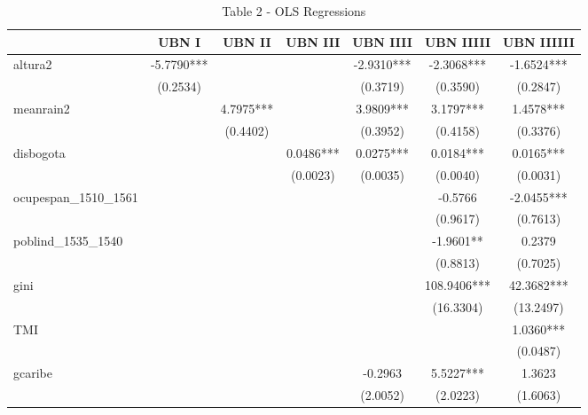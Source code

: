 \begin{table}
\caption{Table 2 - OLS Regressions}
\begin{center}
\begin{tabular}{lcccccc}
\hline
                      &   UBN I    &   UBN II  &  UBN III  &  UBN IIII  &  UBN IIIII  & UBN IIIIII  \\
\midrule
altura2               & -5.7790*** &           &           & -2.9310*** & -2.3068***  & -1.6524***  \\
                      & (0.2534)   &           &           & (0.3719)   & (0.3590)    & (0.2847)    \\
meanrain2             &            & 4.7975*** &           & 3.9809***  & 3.1797***   & 1.4578***   \\
                      &            & (0.4402)  &           & (0.3952)   & (0.4158)    & (0.3376)    \\
disbogota             &            &           & 0.0486*** & 0.0275***  & 0.0184***   & 0.0165***   \\
                      &            &           & (0.0023)  & (0.0035)   & (0.0040)    & (0.0031)    \\
ocupespan\_1510\_1561 &            &           &           &            & -0.5766     & -2.0455***  \\
                      &            &           &           &            & (0.9617)    & (0.7613)    \\
poblind\_1535\_1540   &            &           &           &            & -1.9601**   & 0.2379      \\
                      &            &           &           &            & (0.8813)    & (0.7025)    \\
gini                  &            &           &           &            & 108.9406*** & 42.3682***  \\
                      &            &           &           &            & (16.3304)   & (13.2497)   \\
TMI                   &            &           &           &            &             & 1.0360***   \\
                      &            &           &           &            &             & (0.0487)    \\
gcaribe               &            &           &           & -0.2963    & 5.5227***   & 1.3623      \\
                      &            &           &           & (2.0052)   & (2.0223)    & (1.6063)    \\

\end{tabular}
\end{center}
\end{table}
